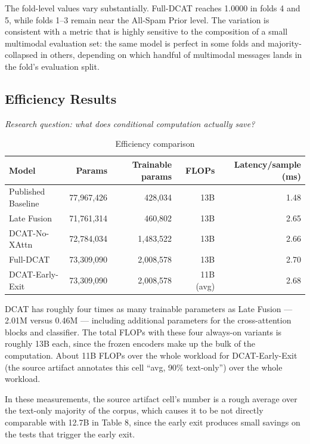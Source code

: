 \documentclass[10pt,twoside]{article}
\begin{document}
The fold-level values vary substantially. Full-DCAT reaches 1.0000 in folds 4 and 5, while folds 1--3 remain near the All-Spam Prior level. The variation is consistent with a metric that is highly sensitive to the composition of a small multimodal evaluation set: the same model is perfect in some folds and majority-collapsed in others, depending on which handful of multimodal messages lands in the fold's evaluation split.

\subsection{Efficiency Results}\label{sec:7.7}

\emph{Research question: what does conditional computation actually save?}

\begin{table}[t]
\centering
\caption{Efficiency comparison}
\label{tab:efficiency}
\small
\setlength{\tabcolsep}{3.6pt}
\begin{tabular}{lrrrr}\toprule
Model & Params & Trainable params & FLOPs & Latency/sample (ms) \\
\midrule
Published Baseline & 77,967,426 & 428,034 & ~13B & 1.48 \\
Late Fusion & 71,761,314 & 460,802 & ~13B & 2.65 \\
DCAT-No-XAttn & 72,784,034 & 1,483,522 & ~13B & 2.66 \\
Full-DCAT & 73,309,090 & 2,008,578 & ~13B & 2.70 \\
DCAT-Early-Exit & 73,309,090 & 2,008,578 & ~11B (avg) & 2.68 \\
\bottomrule
\end{tabular}

\end{table}

DCAT has roughly four times as many trainable parameters as Late Fusion --- 2.01M versus 0.46M --- including additional parameters for the cross-attention blocks and classifier. The total FLOPs with these four always-on variants is roughly 13B each, since the frozen encoders make up the bulk of the computation. About 11B FLOPs over the whole workload for DCAT-Early-Exit (the source artifact annotates this cell ``avg, 90\% text-only'') over the whole workload.

In these measurements, the source artifact cell's number is a rough average over the text-only majority of the corpus, which causes it to be not directly comparable with 12.7B in Table 8, since the early exit produces small savings on the tests that trigger the early exit.
\end{document}
